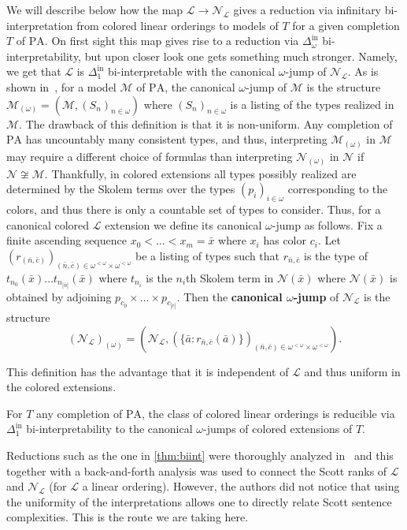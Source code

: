 \documentclass[11pt]{amsart}
\newcommand{\M}{\mathcal{M}}
\newcommand{\N}{\mathcal{N}}
\newcommand{\mc}[1]{\mathcal{#1}}
\newcommand{\Dinf}[1]{\Delta^{\mathrm{in}}_{#1}}
\newcommand{\PA}{\mathrm{PA}}
\def\M{{\mathcal M}}
\def\N{{\mathcal N}}
\theoremstyle{remark}
\newcommand{\define}[1]{\textbf{#1}}
\begin{document}
We will describe below how the map $\mc{L}\to \N_\mc{L}$ gives a reduction via infinitary bi-interpretation from colored linear orderings to models of $T$ for a given completion $T$ of $\PA$. 
On first sight this map gives rise to a reduction via $\Dinf{\omega}$ bi-interpretability, but upon closer look one gets something much stronger. Namely, we get that $\mc{L}$ is $\Dinf{1}$ bi-interpretable with the canonical $\omega$-jump of $\N_\mc{L}$. As is shown in~\cite[Proposition 16]{MR23}, for a model $\M$ of $\PA$, the canonical $\omega$-jump of $\M$ is the structure $\M_{(\omega)}=(\M,(S_n)_{n\in\omega})$ where $(S_n)_{n\in\omega}$ is a listing of the types realized in $\M$. The drawback of this definition is that it is non-uniform. 
Any completion of $\PA$ has uncountably many consistent types, and thus, interpreting $\M_{(\omega)}$ in $\M$ may require a different choice of formulas than interpreting $\N_{(\omega)}$ in $\N$ if $\N\not\cong\M$. Thankfully, in colored extensions all types possibly realized are determined by the Skolem terms over the types $(p_i)_{i\in\omega}$ corresponding to the colors, and thus there is only a countable set of types to consider. Thus, for a canonical colored $\mc{L}$ extension we define its canonical $\omega$-jump as follows. Fix a finite ascending sequence $x_0<\dots <x_m=\bar x$ where $x_i$ has color $c_i$.
Let $(r_{(\bar n,\bar c)})_{(\bar n,\bar c)\in\omega^{<\omega}\times \omega^{<\omega}}$ be a listing of types such that $r_{\bar n,\bar c}$ is the type of $t_{n_0}(\bar x)\dots t_{n_{|\bar n|}}(\bar x)$ where $t_{n_i}$ is the $n_i$th Skolem term in $\N(\bar x)$ where $\N(\bar x)$ is obtained by adjoining $p_{c_0}\times\dots\times p_{c_{|\bar c|}}$. Then the \define{canonical $\omega$-jump} of $\N_\mc{L}$ is the structure
\[ (\N_\mc{L})_{(\omega)}=(\N_\mc{L},(\{ \bar a: r_{\bar n,\bar c}(\bar a)\})_{(\bar n,\bar c)\in\omega^{<\omega} \times \omega^{<\omega}}).\]

This definition has the advantage that it is independent of $\mc{L}$ and thus uniform in the colored extensions.
\begin{theorem}\label{thm:biint}
	For $T$ any completion of $\PA$, the class of colored linear orderings is reducible via $\Dinf{1}$ bi-interpretability to the canonical $\omega$-jumps of colored extensions of $T$.
\end{theorem}
Reductions such as the one in \cref{thm:biint} were thoroughly analyzed in~\cite{MR23} and this together with a back-and-forth analysis was used to connect the Scott ranks of $\mc{L}$ and $\N_\mc{L}$ (for $\mc{L}$ a linear ordering). However, the authors did not notice that using the uniformity of the interpretations allows one to directly relate Scott sentence complexities. This is the route we are taking here.
\end{document}
